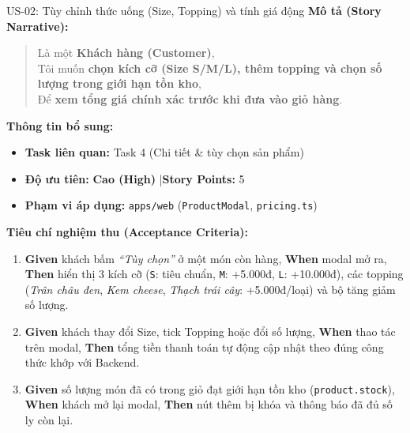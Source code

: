 \documentclass[12pt,a4paper]{article}
\begin{document}
\vspace{0.4cm}

\begin{userstorybox}{US-02: Tùy chỉnh thức uống (Size, Topping) và tính giá động}
    \textbf{Mô tả (Story Narrative):}
    \begin{quote}
        Là một \textbf{Khách hàng (Customer)},\\
        Tôi muốn \textbf{chọn kích cỡ (Size S/M/L), thêm topping và chọn số lượng trong giới hạn tồn kho},\\
        Để \textbf{xem tổng giá chính xác trước khi đưa vào giỏ hàng}.
    \end{quote}

    \textbf{Thông tin bổ sung:}
    \begin{itemize}[noitemsep]
        \item \textbf{Task liên quan:} Task 4 (Chi tiết \& tùy chọn sản phẩm)
        \item \textbf{Độ ưu tiên:} \textcolor{taghigh}{\textbf{Cao (High)}} \quad|\quad \textbf{Story Points:} 5
        \item \textbf{Phạm vi áp dụng:} \texttt{apps/web} (\texttt{ProductModal}, \texttt{pricing.ts})
    \end{itemize}

    \textbf{Tiêu chí nghiệm thu (Acceptance Criteria):}
    \begin{enumerate}[noitemsep]
        \item \textbf{Given} khách bấm \textit{``Tùy chọn''} ở một món còn hàng, \textbf{When} modal mở ra, \textbf{Then} hiển thị 3 kích cỡ (\texttt{S}: tiêu chuẩn, \texttt{M}: +5.000đ, \texttt{L}: +10.000đ), các topping (\textit{Trân châu đen}, \textit{Kem cheese}, \textit{Thạch trái cây}: +5.000đ/loại) và bộ tăng giảm số lượng.
        \item \textbf{Given} khách thay đổi Size, tick Topping hoặc đổi số lượng, \textbf{When} thao tác trên modal, \textbf{Then} tổng tiền thanh toán tự động cập nhật theo đúng công thức khớp với Backend.
        \item \textbf{Given} số lượng món đã có trong giỏ đạt giới hạn tồn kho (\texttt{product.stock}), \textbf{When} khách mở lại modal, \textbf{Then} nút thêm bị khóa và thông báo đã đủ số ly còn lại.
    \end{enumerate}
\end{userstorybox}

\newpage
\end{document}
